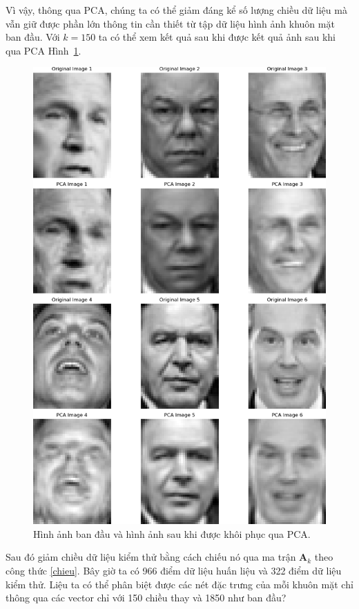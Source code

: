\documentclass[12pt,a4paper,oneside]{report}
\numberwithin{equation}{section}
\begin{document}
Vì vậy, thông qua PCA, chúng ta có thể giảm đáng kể số lượng chiều dữ liệu mà vẫn giữ được phần lớn thông tin cần thiết từ tập dữ liệu hình ảnh khuôn mặt ban đầu. Với $k =150$ ta có thể xem kết quả sau khi được kết quả ảnh sau khi qua PCA Hình~\ref{fig:eigenface}.
\begin{figure}[htp]
	\centering
	\includegraphics[scale=0.62]{eigenface.png}
	\caption{Hình ảnh ban đầu và hình ảnh sau khi được khôi phục qua PCA.}
	\label{fig:eigenface}
\end{figure}
Sau đó giảm chiều dữ liệu kiểm thử bằng cách chiếu nó qua ma trận $\mathbf{A}_k$ theo công thức \ref{chieu}.
Bây giờ ta có 966 điểm dữ liệu huấn liệu và 322 điểm dữ liệu kiểm thử. Liệu ta có thể phân biệt được các nét đặc trưng của mỗi khuôn mặt chỉ thông qua các vector chỉ với 150 chiều thay và 1850 như ban đầu?
\end{document}
